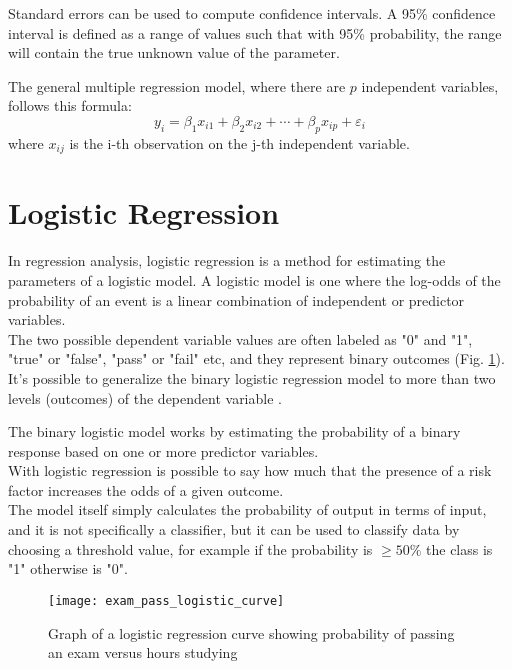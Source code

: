 Standard errors can be used to compute confidence intervals. A 95\% confidence interval is defined as a range of values such that with 95\% probability, the range will contain the true unknown value of the parameter.

The general multiple regression model, where there are $p$ independent variables, follows this formula:
\begin{equation}
y_{i}=\beta_{1}x_{i1} + \beta_{2}x_{i2} + \cdots + \beta_{p}x_{ip} + \varepsilon_{i}
\end{equation}
where $x_{ij}$ is the i-th observation on the j-th independent variable.

\pagebreak

\section{Logistic Regression} \label{logreg}
In regression analysis, logistic regression is a method for estimating the parameters of a logistic model. A logistic model is one where the log-odds of the probability of an event is a linear combination of independent or predictor variables. \\
The two possible dependent variable values are often labeled as "0" and "1", "true" or "false", "pass" or "fail" etc, and they represent binary outcomes (Fig. \ref{fig:logistic_exam}). \\
It's possible to generalize the binary logistic regression model to more than two levels (outcomes) of the dependent variable \cite{wiki:logisticreg}.

The binary logistic model works by estimating the probability of a binary response based on one or more predictor variables.\\
With logistic regression is possible to say how much that the presence of a risk factor increases the odds of a given outcome. \\
The model itself simply calculates the probability of output in terms of input, and it is not specifically a classifier, but it can be used to classify data by choosing a threshold value, for example if the probability is $\ge 50\%$ the class is "1" otherwise is "0".

\begin{figure}[H]
	\centering
	\texttt{[image: exam\_pass\_logistic\_curve]}
	\caption{Graph of a logistic regression curve showing probability of passing an exam versus hours studying \cite{wiki:logisticreg}}
	\label{fig:logistic_exam}
\end{figure}

